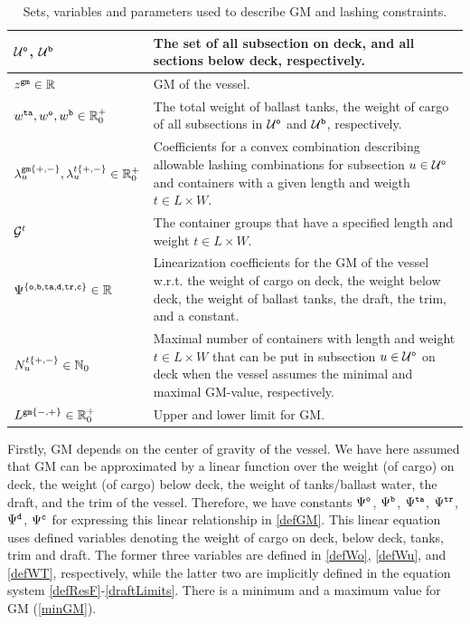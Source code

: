 \begin{table}
\begin{tabular}{lp{10cm}}
$\mathcal{U}^\texttt{o}$, $\mathcal{U}^\texttt{b}$	& The set of all subsection on deck, and all sections below deck, respectively.\\
\hline 
$z^{\texttt{gm}}\in\mathbb{R}$					&	GM of the vessel.\\
$w^{\texttt{ta}}, w^\texttt{o}, w^\texttt{b}\in\mathbb{R}^+_0$	
																		&	The total weight of ballast tanks, the weight of cargo of all subsections in $\mathcal{U}^\texttt{o}$  and $\mathcal{U}^\texttt{b}$, respectively.\\
$\lambda^{\texttt{gm}\{+,-\}}_{u}, \lambda^{t\{+,-\}}_{u}\in\mathbb{R}^+_0$ 
																		&	Coefficients for a convex combination describing allowable lashing combinations for subsection $u\in \mathcal{U}^\texttt{o}$ and containers with a given length and weigth $t\in L\times W$.\\
\hline
$\mathcal{G}^t$													& The container groups that have a specified length and weight $t\in L\times W$.\\
$\Psi^{\{\tt{o},\texttt{b},\texttt{ta},\texttt{d},\texttt{tr},\texttt{c}\}}\in\mathbb{R}$	
																		& Linearization coefficients for the GM of the vessel w.r.t. the weight of cargo on deck, the weight below deck, the weight of ballast tanks, the draft, the trim, and a constant.\\
$N^{t\{+,-\}}_{u}\in\mathbb{N}_0$				& Maximal number of containers with length and weight $t\in L\times W$ that can be put in subsection $u\in \mathcal{U}^\texttt{o}$ on deck when the vessel assumes the minimal and maximal GM-value, respectively.\\
$L^{\texttt{gm}\{-,+\}}\in\mathbb{R}^+_0$ 	& Upper and lower limit for GM.
\end{tabular}
\caption{Sets, variables and parameters used to describe GM and lashing constraints.}\label{tab:gm}
\end{table}
 
Firstly, GM depends on the center of gravity of the vessel. We have here assumed that GM can be approximated by a linear function over the weight (of cargo) on deck, the weight (of cargo) below deck, the weight of tanks/ballast water, the draft, and the trim of the vessel. Therefore, we have constants $\Psi^{\texttt{o}}$, $\Psi^{\texttt{b}}$, $\Psi^{\texttt{ta}}$, $\Psi^{\texttt{tr}}$, $\Psi^{\texttt{d}}$, $\Psi^{\texttt{c}}$ for expressing this linear relationship in \eqref{defGM}. This linear equation uses defined variables denoting the weight of cargo on deck, below deck, tanks, trim and draft. The former three variables are defined in \eqref{defWo}, \eqref{defWu}, and \eqref{defWT}, respectively, while the latter two are implicitly defined in the equation system \eqref{defResF}-\eqref{draftLimits}. There is a minimum and a maximum value for GM (\ref{minGM}). %

